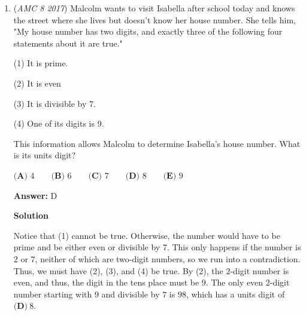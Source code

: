 \begin{enumerate}
 



\textbf{Solution 2}

We are given one of the numbers that can represent $Z$, so we can just try out the options to see which one is a factor of $247247$. By the previous solution, 19 does not work even though it is a factor of the example number. We get $\boxed{\textbf{(A)}\ 11}$.

 



\textbf{Solution 3( similar to solution 1)}

Similar to solution 1, let $Z=ABCABC$. To prove it is divisible by 11, we can compute its alternating sum, which is $A-B+C-A+B-C=0$, which is divisible by 11. Therefore, the answer is $\boxed{\textbf{(A)}\ 11}$.

 



\textbf{Solution 4}

We can find that all numbers like $Z$ are divisible by 1001. 1001 is 7 x 11 x 13 and when we divide 11, we get a whole number. So, the answer is $\boxed{\textbf{(A)}\ 11}$. 

 


	\item (\textit{AMC 8 2017}) Malcolm wants to visit Isabella after school today and knows the street where she lives but doesn't know her house number. She tells him, "My house number has two digits, and exactly three of the following four statements about it are true."


 (1) It is prime.


 (2) It is even


 (3) It is divisible by 7.


 (4) One of its digits is 9.


 This information allows Malcolm to determine Isabella's house number. What is its units digit?


 $\textbf{(A) }4\qquad\textbf{(B) }6\qquad\textbf{(C) }7\qquad\textbf{(D) }8\qquad\textbf{(E) }9$

 \textbf{Answer: }D



\textbf{Solution}

Notice that (1) cannot be true. Otherwise, the number would have to be prime and be either even or divisible by 7. This only happens if the number is 2 or 7, neither of which are two-digit numbers, so we run into a contradiction. Thus, we must have (2), (3), and (4) be true. By (2), the $2$-digit number is even, and thus, the digit in the tens place must be $9$. The only even $2$-digit number starting with $9$ and divisible by $7$ is $98$, which has a units digit of $\boxed{\textbf{(D)}\ 8}.$




\end{enumerate}
